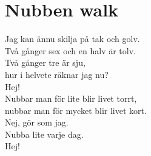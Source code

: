 \section{Nubben walk}
Jag kan ännu skilja på tak och golv.\\
Två gånger sex och en halv är tolv.\\
Två gånger tre är sju,\\
hur i helvete räknar jag nu?\\
Hej!\\
Nubbar man för lite blir livet torrt,\\
nubbar man för mycket blir livet kort.\\
Nej, gör som jag.\\
Nubba lite varje dag.\\
Hej!\\